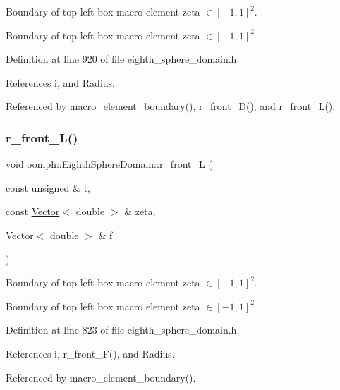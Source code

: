 Boundary of top left box macro element zeta $ \in [-1,1]^2 $. 

Boundary of top left box macro element zeta $ \in [-1,1]^2 $ 

Definition at line 920 of file eighth\+\_\+sphere\+\_\+domain.\+h.



References i, and Radius.



Referenced by macro\+\_\+element\+\_\+boundary(), r\+\_\+front\+\_\+\+D(), and r\+\_\+front\+\_\+\+L().

\mbox{\label{classoomph_1_1EighthSphereDomain_a161d1ad8c0e991e9228a0725d7c9ccd9}} 
\subsubsection{\texorpdfstring{r\+\_\+front\+\_\+\+L()}{r\_front\_L()}}
{\footnotesize\ttfamily void oomph\+::\+Eighth\+Sphere\+Domain\+::r\+\_\+front\+\_\+L (\begin{DoxyParamCaption}\item[{const unsigned \&}]{t,  }\item[{const \hyperlink{classoomph_1_1Vector}{Vector}$<$ double $>$ \&}]{zeta,  }\item[{\hyperlink{classoomph_1_1Vector}{Vector}$<$ double $>$ \&}]{f }\end{DoxyParamCaption})\hspace{0.3cm}{\ttfamily [private]}}



Boundary of top left box macro element zeta $ \in [-1,1]^2 $. 

Boundary of top left box macro element zeta $ \in [-1,1]^2 $ 

Definition at line 823 of file eighth\+\_\+sphere\+\_\+domain.\+h.



References i, r\+\_\+front\+\_\+\+F(), and Radius.



Referenced by macro\+\_\+element\+\_\+boundary().

\mbox{\label{classoomph_1_1EighthSphereDomain_a5d32fe51e8ca993b12f911593ad46ca7}} 
